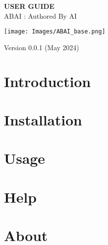 \documentclass[12]{article}
\begin{document}
\begin{Large}
\begin{titlepage}
    \begin{center}
        \vspace*{3cm}
            
        \Huge
        \textbf{\textsc{USER GUIDE}}\\
        \vspace{1cm}
        \huge 
        ABAI : Authored By AI
            
        \vspace{2cm}
        \texttt{[image: Images/ABAI\_base.png]}
        \vfill
    \end{center}
    
    \hfill %
    \begin{minipage}[b]{0.5\textwidth}
        \raggedright 
        \Large 
        Version 0.0.1 (May 2024)
        \vspace*{1cm}
    \end{minipage}
    
\end{titlepage}

\clearpage
\tableofcontents
\clearpage

\section{Introduction}

\clearpage
\section{Installation}

\clearpage
\section{Usage}

\clearpage
\section{Help}

\clearpage
\section{About}
\label{sec:About}

\clearpage
\end{Large}
\end{document}
